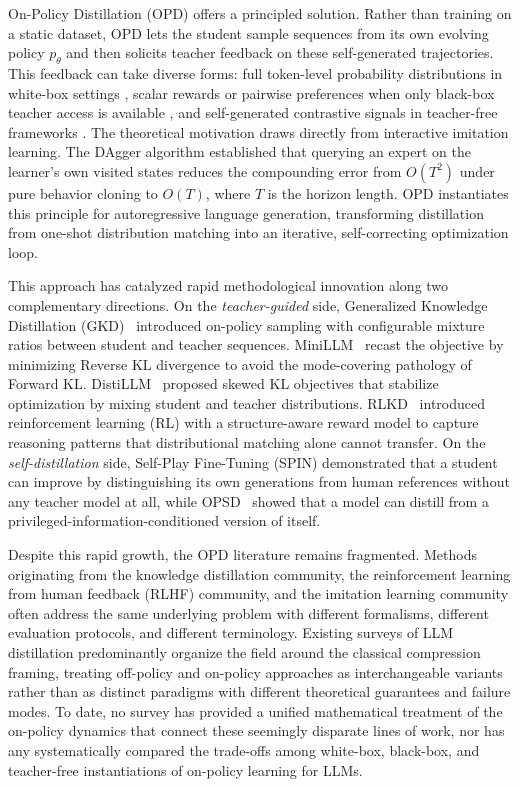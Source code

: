 \documentclass{article} %
\newcommand{\ptheta}{p_\theta}
\begin{document}
On-Policy Distillation (OPD) offers a principled solution. Rather than training on a static dataset, OPD lets the student sample sequences from its own evolving policy $\ptheta$ and then solicits teacher feedback on these self-generated trajectories. This feedback can take diverse forms: full token-level probability distributions in white-box settings \citep{2306.13649,2306.08543}, scalar rewards or pairwise preferences when only black-box teacher access is available \citep{2511.10643,2305.12870}, and self-generated contrastive signals in teacher-free frameworks \citep{2401.01335}. The theoretical motivation draws directly from interactive imitation learning. The DAgger algorithm \citep{ross2011reduction} established that querying an expert on the learner's own visited states reduces the compounding error from $O(T^2)$ under pure behavior cloning to $O(T)$, where $T$ is the horizon length. OPD instantiates this principle for autoregressive language generation, transforming distillation from one-shot distribution matching into an iterative, self-correcting optimization loop.

This approach has catalyzed rapid methodological innovation along two complementary directions. On the \emph{teacher-guided} side, Generalized Knowledge Distillation (GKD)~\citep{2306.13649} introduced on-policy sampling with configurable mixture ratios between student and teacher sequences. MiniLLM~\citep{2306.08543} recast the objective by minimizing Reverse KL divergence to avoid the mode-covering pathology of Forward KL. DistiLLM~\citep{2402.03898} proposed skewed KL objectives that stabilize optimization by mixing student and teacher distributions. RLKD~\citep{2505.16142} introduced reinforcement learning (RL) with a structure-aware reward model to capture reasoning patterns that distributional matching alone cannot transfer. On the \emph{self-distillation} side, Self-Play Fine-Tuning (SPIN) \citep{2401.01335} demonstrated that a student can improve by distinguishing its own generations from human references without any teacher model at all, while OPSD~\citep{2601.18734} showed that a model can distill from a privileged-information-conditioned version of itself.

Despite this rapid growth, the OPD literature remains fragmented. Methods originating from the knowledge distillation community, the reinforcement learning from human feedback (RLHF) community, and the imitation learning community often address the same underlying problem with different formalisms, different evaluation protocols, and different terminology. Existing surveys of LLM distillation \citep{2402.13116} predominantly organize the field around the classical compression framing, treating off-policy and on-policy approaches as interchangeable variants rather than as distinct paradigms with different theoretical guarantees and failure modes. To date, no survey has provided a unified mathematical treatment of the on-policy dynamics that connect these seemingly disparate lines of work, nor has any systematically compared the trade-offs among white-box, black-box, and teacher-free instantiations of on-policy learning for LLMs.
\end{document}
